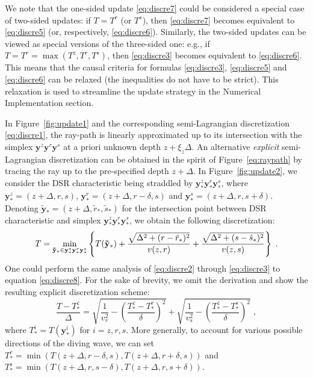 We note that the one-sided update \ref{eq:discre7} could be considered a special case of two-sided updates: if 
$T= T^r$ (or $T^s$), then \ref{eq:discre7} becomes equivalent to \ref{eq:discre5} (or, respectively, 
\ref{eq:discre6}). Similarly, the two-sided updates can be viewed as special versions of the three-sided one: 
e.g., if $T = T^r = \max(T^z,T^r,T^s)$, then \ref{eq:discre3} becomes equivalent to \ref{eq:discre6}. This means 
that the causal criteria for formulas \ref{eq:discre3}, \ref{eq:discre5} and \ref{eq:discre6} can be relaxed (the 
inequalities do not have to be strict). This relaxation is used to streamline the update strategy in the 
Numerical Implementation section.

In Figure~\ref{fig:update1} and the corresponding semi-Lagrangian discretization \ref{eq:discre1}, the ray-path 
is linearly approximated up to its intersection with the simplex $\mathbf{y}^z \mathbf{y}^r \mathbf{y}^s$ at a 
priori unknown depth $z + \xi_z \Delta$. An alternative \textit{explicit} semi-Lagrangian discretization can be 
obtained in the spirit of Figure~\ref{eq:raypath} by tracing the ray up to the pre-specified depth $z + \Delta$. 
In Figure~\ref{fig:update2}, we consider the DSR characteristic being straddled by 
$\mathbf{y}_*^z \mathbf{y}_*^r \mathbf{y}_*^s$, where 
$\mathbf{y}_*^z = (z+\Delta,r,s)$, $\mathbf{y}_*^r = (z+\Delta,r-\delta,s)$ and 
$\mathbf{y}_*^s = (z+\Delta,r,s+\delta)$. Denoting 
$\mathbf{\tilde{y}}_* = (z+\Delta,\tilde{r}_*,\tilde{s}_*)$ for the intersection point between DSR characteristic 
and simplex $\mathbf{y}_*^z \mathbf{y}_*^r \mathbf{y}_*^s$, we obtain the following discretization:
\begin{equation}
\label{eq:discre8}
T = \smash{\displaystyle\min_{\mathbf{\tilde{y}_*} \in \mathbf{y}_*^z \mathbf{y}_*^r \mathbf{y}_*^s}} 
\left\{ T (\mathbf{\tilde{y}}_*) + \frac{\sqrt{\Delta^2 + (r-\tilde{r}_*)^2}}{v (z,r)} 
+ \frac{\sqrt{\Delta^2 + (s-\tilde{s}_*)^2}}{v (z,s)} \right\}\;.
\end{equation}
One could perform the same analysis of \ref{eq:discre2} through \ref{eq:discre3} to equation \ref{eq:discre8}. 
For the sake of brevity, we omit the derivation and show the resulting explicit discretization scheme: 
\begin{equation}
\label{eq:discre9}
\frac{T-T_*^z}{\Delta} = 
\sqrt{\frac{1}{v_r^2} - \left( \frac{T_*^z-T_*^r}{\delta} \right)^2} + 
\sqrt{\frac{1}{v_s^2} - \left( \frac{T_*^z-T_*^s}{\delta} \right)^2}\;,
\end{equation}
where $T_*^i = T (\mathbf{y}_*^i)$ for $i = z,r,s$. More generally, to account for various possible directions 
of the diving wave, we can set $T_*^r = \min \left(T (z+\Delta,r-\delta,s), T (z+\Delta,r+\delta,s)\right)$ and 
$T_*^s = \min \left(T (z+\Delta,r,s-\delta), T (z+\Delta,r,s+\delta)\right)$.

